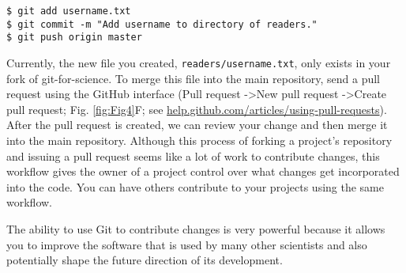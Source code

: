 \begin{verbatim}
$ git add username.txt
$ git commit -m "Add username to directory of readers."
$ git push origin master
\end{verbatim}

Currently, the new file you created, \verb|readers/username.txt|, only exists in your fork of git-for-science.
To merge this file into the main repository, send a pull request using the GitHub interface (Pull request -\textgreater New pull request -\textgreater Create pull request; Fig. \ref{fig:Fig4}F; see \href{https://help.github.com/articles/using-pull-requests/}{help.github.com/articles/using-pull-requests}).
After the pull request is created, we can review your change and then merge it into the main repository.
Although this process of forking a project’s repository and issuing a pull request seems like a lot of work to contribute changes, this workflow gives the owner of a project control over what changes get incorporated into the code.
You can have others contribute to your projects using the same workflow.

The ability to use Git to contribute changes is very powerful because it allows you to improve the software that is used by many other scientists and also potentially shape the future direction of its development.
